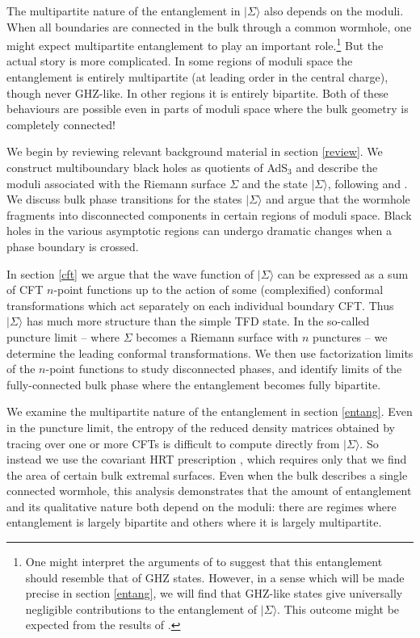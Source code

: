 \documentclass[12pt]{article}
\numberwithin{equation}{section}
\begin{document}
The multipartite nature of the entanglement in $|\Sigma\rangle$  also depends on the moduli.
When all boundaries are connected in the bulk through a common wormhole, one might expect multipartite entanglement to play an important role.\footnote{One might interpret the arguments of \cite{Susskind:2014ira} to suggest that this entanglement should resemble that of GHZ states.  However, in a sense which will be made precise in section \ref{entang}, we will find that GHZ-like states give universally negligible contributions to the entanglement of $|\Sigma \rangle$. This outcome might be expected from the results of \cite{hayden2013holographic,Gharibyan:2013aha}.}
But the actual story is more complicated. In some regions of moduli space the entanglement is entirely multipartite (at leading order in the central charge), though never GHZ-like. In other regions it is entirely bipartite.  Both of these behaviours are possible even in parts of moduli space where the bulk geometry is completely connected!

We begin by reviewing relevant background material in section  \ref{review}.  We construct multiboundary black holes as quotients of AdS$_3$ and describe the moduli associated with the Riemann surface $\Sigma$ and the state $|\Sigma\rangle$, following \cite{Brill:1995jv,Aminneborg:1997pz,Brill:1998pr, Aminneborg:1998si} and \cite{Maldacena:2001kr, Krasnov:2000zq, Krasnov:2003ye, Skenderis:2009ju}.  We discuss bulk phase transitions for the states $|\Sigma \rangle$ and argue that the wormhole fragments into disconnected components in certain regions of moduli space. Black holes in the various asymptotic regions can undergo dramatic changes when a phase boundary is crossed.

In section \ref{cft} we argue that the wave function of $|\Sigma\rangle$ can be expressed as a sum of CFT $n$-point functions up to the action of some (complexified) conformal transformations which act separately on each individual boundary CFT. Thus $|\Sigma\rangle$ has much more structure than the simple TFD state. In the so-called puncture limit -- where $\Sigma$ becomes a Riemann surface with $n$ punctures -- we determine the leading conformal transformations. We then use factorization limits of the $n$-point functions to study disconnected phases, and identify limits of the fully-connected bulk phase where the entanglement becomes fully bipartite.

We examine the multipartite nature of the entanglement in section \ref{entang}.  Even in the puncture limit, the entropy of the reduced density matrices obtained by tracing over one or more CFTs is difficult to compute directly from $|\Sigma\rangle$. So instead we use the covariant HRT prescription \cite{Hubeny:2007xt}, which requires only that we find the area of certain bulk extremal surfaces. Even when the bulk describes a single connected wormhole, this analysis demonstrates that the amount of entanglement and its qualitative nature both depend on the moduli: there are  regimes where entanglement is largely bipartite and others where it is largely multipartite.
\end{document}
